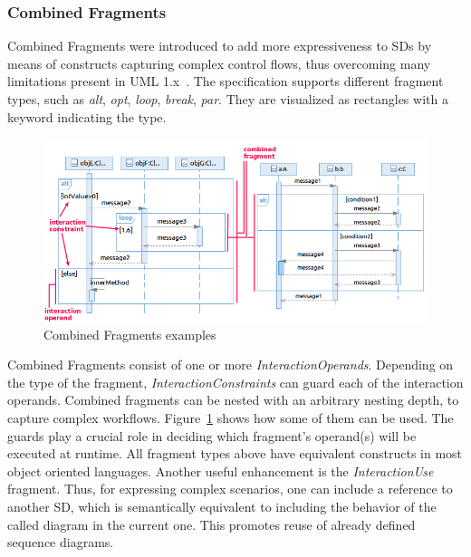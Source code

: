 \documentclass[letter]{llncs}
\newcommand{\figshrink}{\vspace{-.6cm}}
\newcommand{\figshrinkend}{}
\begin{document}
\subsubsection{Combined Fragments}
\label{sec:CombinedFragments}
\vspace{-24 pt}
Combined Fragments were introduced to add more expressiveness to SDs by 
means of constructs capturing complex control flows, thus overcoming many limitations 
present in UML 1.x~\cite{UML2.4}. The specification supports different fragment types,
such as \emph{alt}, \emph{opt}, \emph{loop}, \emph{break}, \emph{par}.
They are visualized as rectangles with a keyword
indicating the type.
\begin{figure}[!b]
\centering
\figshrink
\includegraphics[width=1.0\linewidth,keepaspectratio=true]{./Figure2_newNew.png}
\caption{Combined Fragments examples}
\label{fig:example3}
\figshrinkend
\end{figure}
Combined Fragments consist of one or more \emph{InteractionOperands}. Depending on the type
of the fragment, \emph{InteractionConstraints} can guard each of the interaction operands.
Combined fragments can be nested with an arbitrary nesting depth, to capture complex workflows. Figure~\ref{fig:example3}
shows how some of them can be used. The guards play a crucial role in deciding which fragment's operand(s) will
be executed at runtime.
All fragment types above have equivalent constructs in most object oriented languages. 
Another useful enhancement is the \emph{InteractionUse} fragment. Thus, for expressing
complex scenarios, one can include a reference to another SD, which is semantically
equivalent to including the behavior of the called diagram in the current one. This promotes reuse of already defined
sequence diagrams. 
\vspace{-9 pt}
\end{document}
